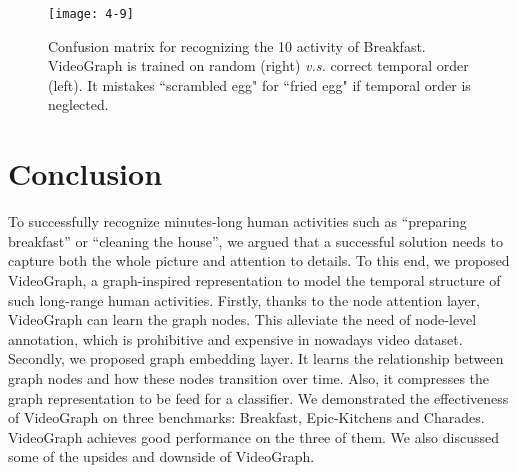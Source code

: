 \documentclass[10pt,twocolumn,letterpaper]{article}
\begin{document}
\begin{figure}[!ht]
\begin{center}
\texttt{[image: 4-9]}
\end{center}
\vspace*{-5mm}
\caption{Confusion matrix for recognizing the 10 activity of Breakfast.
VideoGraph is trained on random (right) \textit{v.s.} correct temporal order (left).
It mistakes ``scrambled egg" for ``fried egg" if temporal order is neglected.}
\label{fig:4-11}
\vspace*{-5mm}
\end{figure}

\section{Conclusion}\label{sec:conclusions}
To successfully recognize minutes-long human activities such as ``preparing breakfast'' or ``cleaning the house'', we argued that a successful solution needs to capture both the whole picture and attention to details. To this end, we proposed VideoGraph, a graph-inspired representation to model the temporal structure of such long-range human activities.
Firstly, thanks to the node attention layer, VideoGraph can learn the graph nodes. This alleviate the need of node-level annotation, which is prohibitive and expensive in nowadays video dataset.
Secondly, we proposed graph embedding layer.
It learns the relationship between graph nodes and how these nodes transition over time.
Also, it compresses the graph representation to be feed for a classifier.
We demonstrated the effectiveness of VideoGraph on three benchmarks: Breakfast, Epic-Kitchens and Charades.
VideoGraph achieves good performance on the three of them.
We also discussed some of the upsides and downside of VideoGraph.

{\small


}
\end{document}
